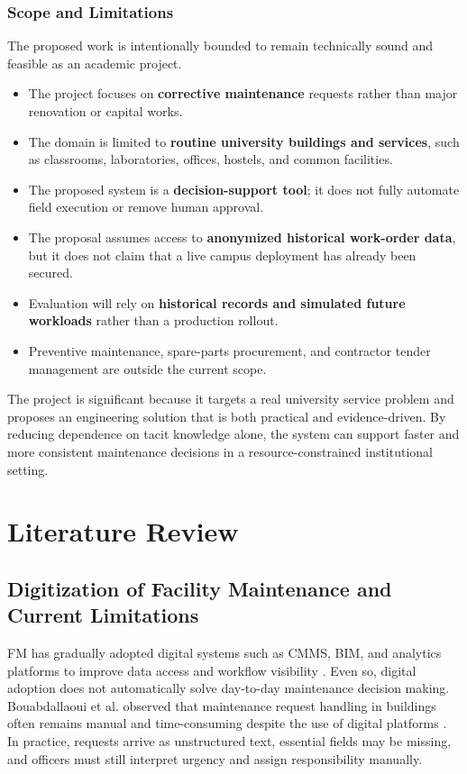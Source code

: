 \documentclass[11pt,a4paper]{report}
\begin{document}
\subsection{Scope and Limitations}
The proposed work is intentionally bounded to remain technically sound and feasible as an academic project.
\begin{itemize}[leftmargin=1.5em]
    \item The project focuses on \textbf{corrective maintenance} requests rather than major renovation or capital works.
    \item The domain is limited to \textbf{routine university buildings and services}, such as classrooms, laboratories, offices, hostels, and common facilities.
    \item The proposed system is a \textbf{decision-support tool}; it does not fully automate field execution or remove human approval.
    \item The proposal assumes access to \textbf{anonymized historical work-order data}, but it does not claim that a live campus deployment has already been secured.
    \item Evaluation will rely on \textbf{historical records and simulated future workloads} rather than a production rollout.
    \item Preventive maintenance, spare-parts procurement, and contractor tender management are outside the current scope.
\end{itemize}

The project is significant because it targets a real university service problem and proposes an engineering solution that is both practical and evidence-driven. By reducing dependence on tacit knowledge alone, the system can support faster and more consistent maintenance decisions in a resource-constrained institutional setting.

\chapter{Literature Review}
\section{Digitization of Facility Maintenance and Current Limitations}
\ac{FM} has gradually adopted digital systems such as \ac{CMMS}, \ac{BIM}, and analytics platforms to improve data access and workflow visibility \cite{matarneh2019,yang2019}. Even so, digital adoption does not automatically solve day-to-day maintenance decision making. Bouabdallaoui et al. observed that maintenance request handling in buildings often remains manual and time-consuming despite the use of digital platforms \cite{bouabdallaoui2020}. In practice, requests arrive as unstructured text, essential fields may be missing, and officers must still interpret urgency and assign responsibility manually.
\end{document}
